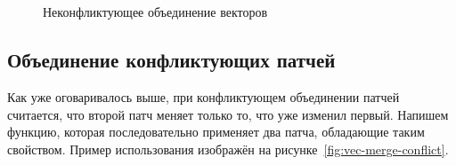 \begin{code}
\\
\>[0]\<[2]%
\>[2] \AgdaSymbol{(}     \AgdaSymbol{)} \AgdaSymbol{(} \AgdaSymbol{)} \AgdaSymbol{(} \AgdaSymbol{)} \AgdaSymbol{=} \<[49]%
\>[49]\<%
\\
\>[2]\<[4]%
\>[4]     \AgdaSymbol{(}  \AgdaSymbol{)} \<%
\end{code}

\begin{figure}
  \centering

  \caption{Неконфликтующее объединение векторов}
  \label{fig:vec-merge-nonconflict}
\end{figure}

\subsection{Объединение конфликтующих патчей}

Как уже оговаривалось выше, при конфликтующем объединении патчей
считается, что второй патч меняет только то, что уже изменил первый.
Напишем функцию, которая последовательно применяет два патча,
обладающие таким свойством. Пример использования изображён на 
рисунке~\ref{fig:vec-merge-conflict}.

